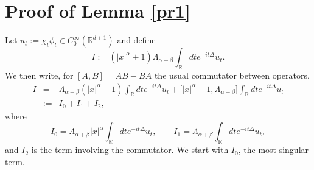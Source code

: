 \documentclass[12pt]{article}
\def \Rm {\mathbb R}
\newcommand{\bee}{\begin{eqnarray*}}
\newcommand{\eee}{\end{eqnarray*}}
\begin{document}
\section{Proof of Lemma  \ref{pr1}} \label{prooflem}
Let $u_t:=\chi_t  \phi_t \in C_0^\infty(\Rm^{d+1})$ and define
$$
I:=(|x|^\alpha+1) \Lambda_{\alpha+\beta} \int_{\Rm } dt e^{-i t \Delta} u_t.
$$
We then write, for $[A,B]=AB-BA$ the usual commutator between operators,
\bee
I&=&\Lambda_{\alpha+\beta} (|x|^\alpha+1) \int_{\Rm } dt e^{-i t \Delta} u_t+ \big[|x|^\alpha+1,\Lambda_{\alpha+\beta}\big]  \int_{\Rm } dt e^{-i t \Delta} u_t\\
&:=&I_0+I_1+I_2,
\eee
where
$$
I_0=\Lambda_{\alpha+\beta} |x|^\alpha \int_{\Rm } dt e^{-i t \Delta} u_t, \qquad I_1=\Lambda_{\alpha+\beta} \int_{\Rm } dt e^{-i t \Delta} u_t,
$$
and $I_2$ is the term involving the commutator. We start with $I_0$, the most singular term. 
\end{document}
